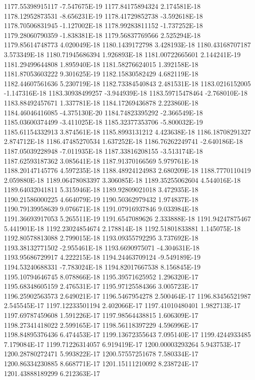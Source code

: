 1177.55398915117  -7.547675E-19
1177.84175894324  2.174581E-18
1178.12952873531  -8.656231E-19
1178.41729852738  -3.592618E-18
1178.70506831945  -1.127002E-18
1178.99283811152  -1.737252E-18
1179.28060790359  -1.838381E-18
1179.56837769566  2.525294E-18
1179.85614748773  4.020049E-18
1180.1439172798  3.428193E-18
1180.43168707187  3.573349E-18
1180.71945686394  1.926893E-18
1181.00722665601  2.144241E-19
1181.29499644808  1.895940E-18
1181.58276624015  1.392158E-18
1181.87053603222  9.301625E-19
1182.15830582429  4.682119E-18
1182.44607561636  5.230719E-18
1182.73384540843  2.481531E-18
1183.0216152005  -1.147316E-18
1183.30938499257  -3.944939E-18
1183.59715478464  -2.768010E-18
1183.88492457671  1.337781E-18
1184.17269436878  2.223860E-18
1184.46046416085  -4.375130E-20
1184.74823395292  -2.366549E-18
1185.03600374499  -3.411025E-18
1185.32377353706  -5.800032E-19
1185.61154332913  3.874561E-18
1185.8993131212  4.423638E-18
1186.18708291327  2.874712E-18
1186.47485270534  1.637252E-18
1186.76262249741  -2.640186E-18
1187.05039228948  -7.011935E-18
1187.33816208155  -3.513174E-18
1187.62593187362  3.085641E-18
1187.91370166569  5.979761E-18
1188.20147145776  4.597235E-18
1188.48924124983  2.680209E-18
1188.7770110419  2.059880E-18
1189.06478083397  3.306085E-18
1189.35255062604  4.544016E-18
1189.64032041811  5.315946E-18
1189.92809021018  3.472935E-18
1190.21586000225  4.664079E-19
1190.50362979432  1.974837E-18
1190.79139958639  9.076671E-18
1191.07916937846  9.033984E-18
1191.36693917053  5.265511E-19
1191.6547089626  2.333888E-18
1191.94247875467  5.441901E-18
1192.23024854674  2.178814E-18
1192.51801833881  1.145075E-18
1192.80578813088  2.799015E-18
1193.09355792295  3.737692E-18
1193.38132771502  -2.955461E-18
1193.6690975071  -4.304631E-18
1193.95686729917  4.222215E-18
1194.24463709124  -9.549189E-19
1194.53240688331  -7.783024E-18
1194.82017667538  8.156845E-19
1195.10794646745  8.078866E-18
1195.39571625952  1.296320E-17
1195.68348605159  2.476531E-17
1195.97125584366  3.005723E-17
1196.25902563573  2.649021E-17
1196.5467954278  2.500464E-17
1196.83456521987  2.545545E-17
1197.12233501194  2.402066E-17
1197.41010480401  1.982713E-17
1197.69787459608  1.591226E-17
1197.98564438815  1.606309E-17
1198.27341418022  2.599165E-17
1198.56118397229  4.596996E-17
1198.84895376436  6.474453E-17
1199.13672355643  7.095140E-17
1199.4244933485  7.179084E-17
1199.71226314057  6.919419E-17
1200.00003293264  5.943753E-17
1200.28780272471  5.993822E-17
1200.57557251678  7.580334E-17
1200.86334230885  8.668771E-17
1201.15111210092  8.238724E-17
1201.43888189299  6.212363E-17
